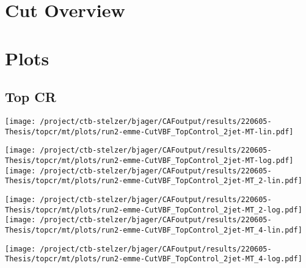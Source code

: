 \documentclass{article}
\begin{document}
\section[Cut Overview]{Cut Overview}

\centering


\section[Plots]{Plots}

\centering

\subsection[Top CR]{Top CR}

\centering

\texttt{[image: /project/ctb-stelzer/bjager/CAFoutput/results/220605-Thesis/topcr/mt/plots/run2-emme-CutVBF\_TopControl\_2jet-MT-lin.pdf]}

\texttt{[image: /project/ctb-stelzer/bjager/CAFoutput/results/220605-Thesis/topcr/mt/plots/run2-emme-CutVBF\_TopControl\_2jet-MT-log.pdf]}\texttt{[image: /project/ctb-stelzer/bjager/CAFoutput/results/220605-Thesis/topcr/mt/plots/run2-emme-CutVBF\_TopControl\_2jet-MT\_2-lin.pdf]}

\texttt{[image: /project/ctb-stelzer/bjager/CAFoutput/results/220605-Thesis/topcr/mt/plots/run2-emme-CutVBF\_TopControl\_2jet-MT\_2-log.pdf]}\texttt{[image: /project/ctb-stelzer/bjager/CAFoutput/results/220605-Thesis/topcr/mt/plots/run2-emme-CutVBF\_TopControl\_2jet-MT\_4-lin.pdf]}

\texttt{[image: /project/ctb-stelzer/bjager/CAFoutput/results/220605-Thesis/topcr/mt/plots/run2-emme-CutVBF\_TopControl\_2jet-MT\_4-log.pdf]}
\end{document}
